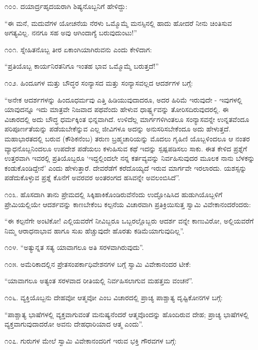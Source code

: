 ೧೦೦. ದಯಾರ್ದ್ರಹೃದಯರಾಗಿ ಶಿಷ್ಯನೊಬ್ಬನಿಗೆ ಹೇಳಿದ್ದು:

“ಈ ಮನೆ, ಮದುವೆಗಳ ಯೋಚನೆಯ ನೆರಳು ಒಮ್ಮೊಮ್ಮೆ ಮನಸ್ಸಿನಲ್ಲಿ ಹಾದು ಹೋದರೆ ನೀನು ಚಿಂತಿಸುವ ಅಗತ್ಯವಿಲ್ಲ. ನನಗೂ ಸಹ ಅವು ಆಗಿಂದಾಗ್ಯೆ ಬರುವುದುಂಟು!” 

೧೦೧. ಸ್ನೇಹಿತನೊಬ್ಬ ತೀರ ಏಕಾಂಗಿಯಾಗಿರುವನು ಎಂದು ಕೇಳಿದಾಗ:

“ಪ್ರತಿಯೊಬ್ಬ ಕಾರ್ಯನಿರತನಿಗೂ ಇಂತಹ ಭಾವ ಒಮ್ಮೊಮ್ಮೆ ಬರುತ್ತದೆ!” 

೧೦೨. ಹಿಂದೂಗಳ ಮತ್ತು ಬೌದ್ಧರ ಸಂನ್ಯಾಸದ ಮತ್ತು ಸಂನ್ಯಾಸವಲ್ಲದ ಆದರ್ಶಗಳ ಬಗ್ಗೆ:

“ಅನೇಕ ಆದರ್ಶಗಳನ್ನು ಹಿಂದೂಧರ್ಮವು ಎತ್ತಿ ಹಿಡಿಯುವುದಾದರೂ, ಅದರ ಹಿರಿಮೆ ಇರುವುದೇ - ಇವುಗಳಲ್ಲಿ ಯಾವುದನ್ನೂ ಇದು ಮಾತ್ರವೇ ನಿಜವಾದ ಪಥವೆಂದು ಹೇಳುವ ಧಾರ್ಷ್ಟ್ಯವನ್ನು ತೋರಿಸದಿರುವುದರಲ್ಲಿ. ಈ ವಿಚಾರದಲ್ಲಿ ಅದು ಬೌದ್ಧ ಧರ್ಮಕ್ಕಿಂತ ಭಿನ್ನವಾಗಿದೆ. ಉಳಿದೆಲ್ಲ ಮಾರ್ಗಗಳಿಗಿಂತಲೂ ಸಂನ್ಯಾಸವನ್ನೇ ಉನ್ನತವೆಂದೂ ಪರಿಪೂರ್ಣತೆಯನ್ನು ಪಡೆಯಬೇಕೆನ್ನುವ ಎಲ್ಲ ಜೀವಿಗಳೂ ಅದನ್ನು ಅನುಸರಿಸಬೇಕೆಂದೂ ಅದು ಹೇಳುತ್ತದೆ. ಮಹಾಭಾರತದಲ್ಲಿ ಬರುವ (ಕೌಶಿಕನೆಂಬ) ತರುಣ ಬ್ರಹ್ಮಚಾರಿಯನ್ನು ಮೊದಲು ಗೃಹಿಣಿ ಯೊಬ್ಬಳಿಂದಲೂ ಆ ನಂತರ ವ್ಯಾಧನೊಬ್ಬನಿಂದಲೂ ಉಪದೇಶ ಪಡೆಯಲು ಕಳುಹಿಸುವ ಕಥೆ ಇದನ್ನು ಸ್ಪಷ್ಪಪಡಿಸಲು ಸಾಕು. ಈತ ಕೇಳಿದ ಪ್ರಶ್ನೆಗೆ ಉತ್ತರವಾಗಿ ಇವರಲ್ಲಿ ಪ್ರತಿಯೊಬ್ಬರೂ ‘ಇದ್ದಲ್ಲಿಂದಲೇ ನನ್ನ ಕರ್ತವ್ಯವನ್ನು ನಿರ್ವಹಿಸುವುದರ ಮೂಲಕ ನಾನು ಬೆಳಕನ್ನು ಕಂಡುಕೊಂಡಿದ್ದೇನೆ’ ಎಂದು ಹೇಳುತ್ತಾರೆ. ದೇವರೆಡೆಗೆ ಕರೆದೊಯ್ಯದೆ ಇರುವ ಮಾರ್ಗವೇ ಇರಲಾರದು. ಯಶಸ್ಸನ್ನು ಪಡೆದುಕೊಳ್ಳುವ ಪ್ರಶ್ನೆ ಕೊನೆಗೆ ಅವರವರ ಅಂತರಂಗದ ಹಸಿವನ್ನೇ ಅವಲಂಬಿಸಿದೆ”. 

೧೦೩. ಹೊಸದಾಗಿ ತಾನು ಪ್ರೇಮದಲ್ಲಿ ಸಿಕ್ಕಿಹಾಕಿಕೊಂಡಿರುವೆನೆಂದು ಉದ್ಘೋಷಿಸಿದ ಹುಡುಗಿಯೊಬ್ಬಳಿಗೆ ಪ್ರೇಮಿಯಲ್ಲಿಯೇ ಆದರ್ಶವನ್ನು ಕಾಣಬೇಕೆಂಬ ಕಲ್ಪನೆಯ ವಿಚಾರವಾಗಿ ಪ್ರತಿಕ್ರಿಯಿಸುತ್ತ ಸ್ವಾಮಿ ವಿವೇಕಾನಂದರೆಂದರು:

“ಈ ಕಲ್ಪನೆಗೇ ಅಂಟಿಕೋ! ಎಲ್ಲಿಯವರೆಗೆ ನೀವಿಬ್ಬರೂ ಒಬ್ಬರಲ್ಲೊಬ್ಬರು ಆದರ್ಶ ವನ್ನೇ ಕಾಣುವಿರೋ, ಅಲ್ಲಿಯವರೆಗೆ ನಿಮ್ಮ ಆರಾಧನಾಭಾವ ಹಾಗೂ ಸುಖ ಹೆಚ್ಚುವುದೇ ಹೊರತು ಕಡಿಮೆಯಾಗುವುದಿಲ್ಲ”. 

೧೦೪. “ಅತ್ಯುನ್ನತ ಸತ್ಯ ಯಾವಾಗಲೂ ಅತಿ ಸರಳವಾಗಿರುವುದು”. 

೧೦೫. ಅಮೆರಿಕಾದಲ್ಲಿನ ಪ್ರೇತಸಂಪರ್ಕಾಧಿವೇಶನಗಳ ಬಗ್ಗೆ ಸ್ವಾಮಿ ವಿವೇಕಾನಂದರ ಟೀಕೆ:

“ಯಾವಾಗಲೂ ಅತ್ಯಂತ ಸರಳವಾದ ರೀತಿಯಲ್ಲಿ ನಿರ್ವಹಿಸಲಾಗುವ ಮಹತ್ತಮ ವಂಚನೆ”. 

೧೦೬. ವ್ಯಕ್ತಿಯೊಬ್ಬನು ದೇಹವೋ ಆತ್ಮವೋ ಎಂಬ ವಿಚಾರದಲ್ಲಿ ಪ್ರಾಚ್ಯ ಪಾಶ್ಚಾತ್ಯ ದೃಷ್ಟಿಕೋನಗಳ ಬಗ್ಗೆ:

“ಪಾಶ್ಚಾತ್ಯ ಭಾಷೆಗಳಲ್ಲಿ ವ್ಯಕ್ತವಾಗುವಂತೆ ಮನುಷ್ಯನೆಂದರೆ ಆತ್ಮವೊಂದನ್ನು ಹೊಂದಿರುವ ದೇಹ; ಪ್ರಾಚ್ಯ ಭಾಷೆಗಳಲ್ಲಿ ವ್ಯಕ್ತವಾಗುವುದಾದರೋ ಅವನು ದೇಹಧಾರಿಯಾದ ಆತ್ಮ ಎಂದು”. 

೧೦೭. ಗುರುಗಳ ಮೇಲೆ ಸ್ವಾಮಿ ವಿವೇಕಾನಂದರಿಗೆ ಇರುವ ಭಕ್ತಿ ಗೌರವಗಳ ಬಗ್ಗೆ:

